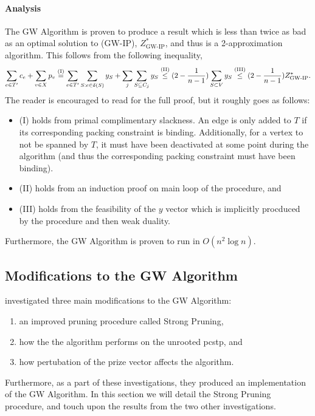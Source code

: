  \paragraph{Analysis}
 The GW Algorithm is proven to produce a result which is less than twice as bad as an optimal solution to (GW-IP), $Z^*_{\text{GW-IP}}$, and thus
 is a 2-approximation algorithm. This follows from the following inequality,
 $$\sum_{e \in T'}c_e + \sum_{v \in X} p_v \overset{\text{(I)}}{=}   \sum_{e \in T'} \sum_{S: e \in \delta(S)} y_S  + \sum_{j} \sum_{S \subseteq C_j} y_S
 \overset{\text{(II)}}{\leq} (2 - \frac{1}{n-1}) \sum_{S \subset V} y_S \overset{\text{(III)}}{\leq} (2 - \frac{1}{n-1}) Z^*_{\text{GW-IP}}\mathnormal{.}$$
 The reader is encouraged to read \citet{goemans1997primal} for the full proof, but it roughly goes as follows:
 \begin{itemize}
 \item (I) holds from primal complimentary slackness. An edge is only added to $T$ if its corresponding packing constraint is binding.
   Additionally, for a vertex to not be spanned by $T$, it must have been deactivated at some point during the
    algorithm (and thus the corresponding packing constraint must have
    been binding).
  \item (II) holds from an induction proof on main loop of the procedure, and
  \item (III) holds from the feasibility of the $y$ vector which is implicitly procduced by the procedure and then weak duality.
 \end{itemize}
 Furthermore, the GW Algorithm is proven to run in $O(n^2 \log n)$.
 \subsection{Modifications to the GW Algorithm}\label{sec:approx:strongpruning}
 \citet{Johnson:2000:PCS:338219.338637} investigated three main modifications to the GW Algorithm:
 \begin{enumerate}
 \item an improved pruning procedure called Strong Pruning,
 \item how the the algorithm performs on the unrooted \gls{pcstp}, and
 \item how pertubation of the prize vector affects the algorithm.
 \end{enumerate}
 Furthermore, as a part of these investigations, they produced an implementation of the GW Algorithm.
 In this section we will detail the Strong Pruning procedure, and touch upon the results from the two other
  investigations.
